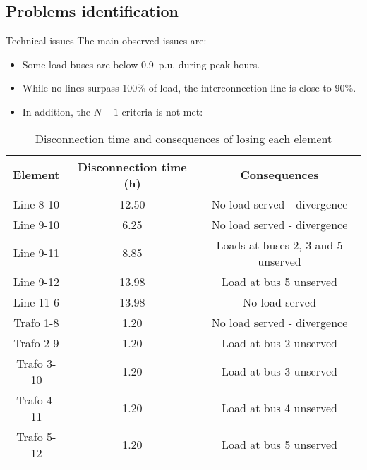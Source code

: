 \subsection{Problems identification}
\begin{frame}{Technical issues}
  The main observed issues are:

  \begin{itemize}
    \item Some load buses are below 0.9~p.u. during peak hours.
    \item While no lines surpass 100\% of load, the interconnection line is close to 90\%.
    \item In addition, the $N-1$ criteria is not met:
  \end{itemize}


\begin{table}[!htb]\centering\footnotesize
  \begin{tabular}[]{ccc}
    \hline 
    \textbf{Element} & \textbf{Disconnection time (h)} & \textbf{Consequences} \\
    \hline
    Line 8-10 & 12.50 & No load served - divergence \\
    Line 9-10 & 6.25 & No load served - divergence \\
    Line 9-11 & 8.85 & Loads at buses 2, 3 and 5 unserved \\
    Line 9-12 & 13.98 & Load at bus 5 unserved \\
    Line 11-6 & 13.98 & No load served \\
    Trafo 1-8 & 1.20 & No load served - divergence \\
    Trafo 2-9 & 1.20 & Load at bus 2 unserved \\
    Trafo 3-10 & 1.20 & Load at bus 3 unserved \\
    Trafo 4-11 & 1.20 & Load at bus 4 unserved \\
    Trafo 5-12 & 1.20 & Load at bus 5 unserved \\
    \hline
  \end{tabular}
  \caption{Disconnection time and consequences of losing each element}
  \label{tab:lt1}
\end{table}

\end{frame}

